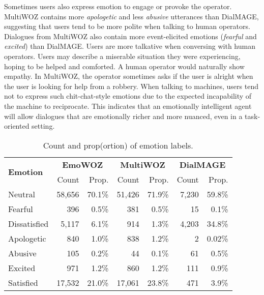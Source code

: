 \documentclass[10pt, a4paper]{article}
\begin{document}
Sometimes users also express emotion to engage or provoke the operator. MultiWOZ contains more \textit{apologetic} and less \textit{abusive} utterances than DialMAGE, suggesting that users tend to be more polite when talking to human operators. Dialogues from MultiWOZ also contain more event-elicited emotions (\textit{fearful} and \textit{excited}) than DialMAGE. Users are more talkative when conversing with human operators. Users may describe a miserable situation they were experiencing, hoping to be helped and comforted. A human operator would naturally show empathy. In MultiWOZ, the operator sometimes asks if the user is alright when the user is looking for help from a robbery. When talking to machines, users tend not to express such chit-chat-style emotions due to the expected incapability of the machine to reciprocate. This indicates that an emotionally intelligent agent will allow dialogues that are emotionally richer and more nuanced, even in a task-oriented setting. \par

\begin{table}[H]
\centering
\footnotesize
\setlength\tabcolsep{1.4pt}
\begin{tabular}{l|rr|rr|rr}
\toprule[1pt]
\multirow{2}{*}{\textbf{Emotion}} & \multicolumn{2}{c|}{\textbf{EmoWOZ}} & \multicolumn{2}{c|}{\textbf{MultiWOZ}} & \multicolumn{2}{c}{\textbf{DialMAGE}} \\
 & Count & Prop. & Count & Prop. & Count & Prop. \\\hline
Neutral & 58,656 & 70.1\% & 51,426 & 71.9\% & 7,230 & 59.8\% \\
Fearful & 396 & 0.5\% & 381 & 0.5\% & 15 & 0.1\% \\
Dissatisfied & 5,117 & 6.1\% & 914 & 1.3\% & 4,203 & 34.8\% \\
Apologetic & 840 & 1.0\% & 838 & 1.2\% & 2 & 0.02\% \\
Abusive & 105 & 0.2\% & 44 & 0.1\% & 61 & 0.5\% \\
Excited & 971 & 1.2\% & 860 & 1.2\% & 111 & 0.9\% \\
Satisfied & 17,532 & 21.0\% & 17,061 & 23.8\% & 471 & 3.9\%\\
\bottomrule[1pt]
\end{tabular}
\caption{Count and prop(ortion) of emotion labels.}
\label{tab:emo-distribution}
\vspace*{-3mm}
\end{table}
\end{document}
